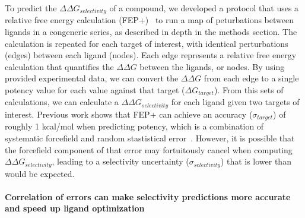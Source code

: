 \documentclass[9pt,lineno]{elife-modified} %
\begin{document}
To predict the $\Delta \Delta G_{selectivity}$ of a compound, we developed a protocol that uses a relative free energy calculation (FEP+)~\citep{Wang:J.Am.Chem.Soc.:2015} to run a map of peturbations between ligands in a congeneric series, as described in depth in the methods section. The calculation is repeated for each target of interest, with identical perturbations (edges) between each ligand (nodes). Each edge represents a relative free energy calculation that quantifies the $\Delta \Delta G$ between the ligands, or nodes. By using provided experimental data, we can convert the $\Delta \Delta G$ from each edge to a single potency value for each value against that target ($\Delta G_{target}$). From this sets of calculations, we can calculate a $\Delta \Delta G_{selectivity}$ for each ligand given two targets of interest. Previous work shows that FEP+ can achieve an accuracy ($\sigma_{target}$) of roughly 1 kcal/mol when predicting potency, which is a combination of systematic forcefield and random stastistical error~\citep{Wang:J.Am.Chem.Soc.:2015}. However, it is possible that the forcefield component of that error may fortuitously cancel when computing $\Delta \Delta G_{selectivity}$, leading to a selectivity uncertainty ($\sigma_{selectivity}$) that is lower than would be expected. 

\paragraph{Correlation of errors can make selectivity predictions more accurate and speed up ligand optimization}
\end{document}
